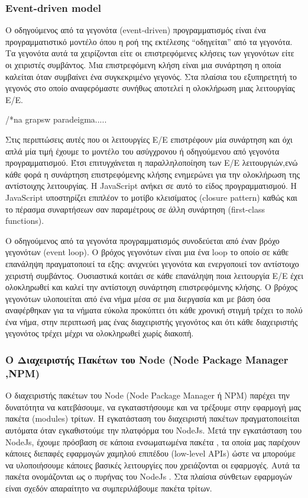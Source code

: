 \subsubsection{Event-driven model}		 

		O οδηγούμενος από τα γεγονότα (event-driven) προγραμματισμός είναι ένα προγραμματιστικό μοντέλο όπου η ροή της εκτέλεσης “οδηγείται” από τα γεγονότα. Τα γεγονότα αυτά τα χειρίζονται είτε οι επιστρεφόμενες κλήσεις των γεγονότων είτε οι χειριστές συμβάντος. Μια επιστρεφόμενη κλήση είναι μια συνάρτηση η οποία καλείται όταν συμβαίνει ένα συγκεκριμένο γεγονός. Στα πλαίσια του εξυπηρετητή το γεγονός στο οποίο αναφερόμαστε συνήθως αποτελεί η ολοκλήρωση μιας λειτουργίας Ε/Ε. 
		

		/*na grapsw paradeigma.....
		
		Στις περιπτώσεις αυτές που οι λειτουργίες Ε/Ε επιστρέφουν μία συνάρτηση και όχι απλά μία τιμή έχουμε το μοντέλο του ασύγχρονου ή οδηγούμενου από γεγονότα προγραμματισμού. Έτσι επιτυγχάνεται η παραλληλοποίηση των Ε/Ε λειτουργιών,ενώ κάθε φορά η συνάρτηση επιστρεφόμενης κλήσης ενημερώνει για την ολοκλήρωση της αντίστοιχης λειτουργίας. Η JavaScript ανήκει σε αυτό το είδος προγραμματισμού. Η JavaScript υποστηρίζει επιπλέον το μοτίβο κλεισίματος (closure pattern) καθώς και το πέρασμα συναρτήσεων σαν παραμέτρους σε άλλη συνάρτηση (first-class functions).
		

		Ο οδηγούμενος από τα γεγονότα προγραμματισμός συνοδεύεται από έναν βρόχο γεγονότων (event loop). Ο βρόχος γεγονότων είναι μια ένα loop το οποίο σε κάθε επανάληψη πραγματοποιεί τα εξης: ανιχνεύει γεγονότα και ενεργοποιεί τον αντίστοιχο χειριστή συμβάντος. Ουσιαστικά κοιτάει σε κάθε επανάληψη ποια λειτουργία Ε/Ε έχει ολοκληρωθεί και καλεί την αντίστοιχη συνάρτηση επιστρεφόμενης κλήσης. Ο βρόχος γεγονότων υλοποιείται από ένα νήμα μέσα σε μια διεργασία και με βάση όσα αναφέρθηκαν για τα νήματα εύκολα προκύπτει ότι κάθε χρονική στιγμή τρέχει το πολύ ένα νήμα, στην περιπτωσή μας ένας διαχειριστής γεγονότος και ότι κάθε διαχειριστής γεγονότος τρέχει μέχρι να ολοκληρωθεί χωρίς διακοπή.
		
		\subsubsection{Ο Διαχειριστής Πακέτων του Node (Node Package Manager ,NPM)}
		

		Ο διαχειριστής πακέτων του Node (Node Package Manager ή NPM) παρέχει την δυνατότητα να κατεβάσουμε, να εγκαταστήσουμε και να τρέξουμε στην εφαρμογή μας πακέτα (modules) τρίτων. H εγκατάσταση του διαχειριστή  πακέτων πραγματοποιείται  αυτόματα όταν εγκαθιστούμε την πλατφόρμα του NodeJs. Μετά την εγκατάσταση του NodeJs, έχουμε πρόσβαση σε κάποια ενσωματωμένα πακέτα , τα οποία μας παρέχουν κάποιες διεπαφές εφαρμογών χαμηλού επιπέδου (low-level APIs) ώστε να μπορούμε να υλοποιήσουμε κάποιες βασικές λειτουργίες που χρειάζονται οι εφαρμογές. Αυτά τα πακέτα ονομάζονται ως ο πυρήνας του NodeJs . Στα πλαίσια σύνθετων εφαρμογών είναι σχεδόν απαραίτητο να συμπεριλάβουμε πακέτα τρίτων.


